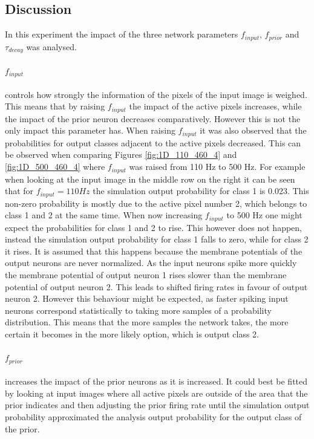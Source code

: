 \subsection{Discussion}

In this experiment the impact of the three network parameters $f_{input}$, $f_{prior}$ and $\tau_{decay}$ was analysed.

\paragraph{$f_{input}$} controls how strongly the information of the pixels of the input image is weighed. This means that by raising $f_{input}$ the impact of the active pixels increases, while the impact of the prior neuron decreases comparatively. However this is not the only impact this parameter has. When raising $f_{input}$ it was also observed that the probabilities for output classes adjacent to the active pixels decreased. This can be observed when comparing Figures \ref{fig:1D_110_460_4} and \ref{fig:1D_500_460_4} where $f_{input}$ was raised from 110 Hz to 500 Hz. For example when looking at the input image in the middle row on the right it can be seen that for $f_{input} = 110 Hz$ the simulation output probability for class 1 is 0.023. This non-zero probability is mostly due to the active pixel number 2, which belongs to class 1 and 2 at the same time. When now increasing $f_{input}$ to 500 Hz one might expect the probabilities for class 1 and 2 to rise. This however does not happen, instead the simulation output probability for class 1 falls to zero, while for class 2 it rises.
It is assumed that this happens because the membrane potentials of the output neurons are never normalized. As the input neurons spike more quickly the membrane potential of output neuron 1 rises slower than the membrane potential of output neuron 2. This leads to shifted firing rates in favour of output neuron 2. However this behaviour might be expected, as faster spiking input neurons correspond statistically to taking more samples of a probability distribution. This means that the more samples the network takes, the more certain it becomes in the more likely option, which is output class 2.

\paragraph{$f_{prior}$} increases the impact of the prior neurons as it is increased. It could best be fitted by looking at input images where all active pixels are outside of the area that the prior indicates and then adjusting the prior firing rate until the simulation output probability approximated the analysis output probability for the output class of the prior.

